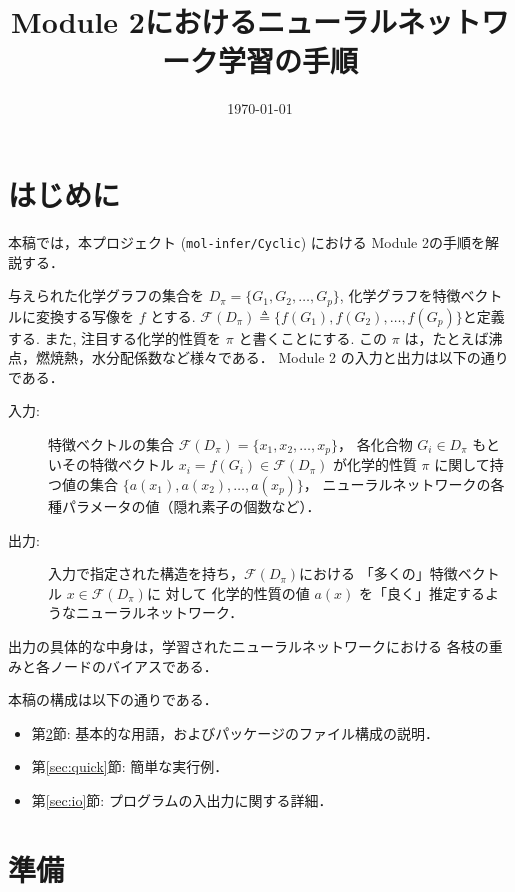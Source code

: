 \documentclass[11pt, titlepage, dvipdfmx, twoside]{jarticle}
\title{\huge Module 2におけるニューラルネットワーク学習の手順}
\author{\project}
\newcommand{\project}{{\tt mol-infer/Cyclic}}
\newcommand{\secref}[1]{第\ref{sec:#1}節}
\begin{document}
\makeatletter 
\let\c@lstlisting\c@figure
\makeatother
{}
\date{\today}
\maketitle
\thispagestyle{empty}
\tableofcontents
\clearpage
{}


\section{はじめに}
本稿では，本プロジェクト (\project) における Module 2の手順を解説する．

与えられた化学グラフの集合を $D_\pi=\{G_1,G_2,\dots,G_p\}$,
化学グラフを特徴ベクトルに変換する写像を $f$ とする.
${\mathcal F}(D_\pi)\triangleq\{f(G_1),f(G_2),\dots,f(G_p)\}$と定義する. 
また, 注目する化学的性質を $\pi$ と書くことにする.
この $\pi$ は，たとえば沸点，燃焼熱，水分配係数など様々である．
Module 2 の入力と出力は以下の通りである．

\begin{oframed}
\begin{description}
\item[入力:] 特徴ベクトルの集合 ${\mathcal F}(D_\pi)=\{x_1,x_2,\dots,x_p\}$，
  各化合物 $G_i\in D_\pi$ もといその特徴ベクトル $x_i=f(G_i)\in{\mathcal F}(D_\pi)$
  が化学的性質 $\pi$ に関して持つ値の集合 $\{a(x_1),a(x_2),\dots,a(x_p)\}$，
  ニューラルネットワークの各種パラメータの値（隠れ素子の個数など）．
\item[出力:] 入力で指定された構造を持ち，${\mathcal F}(D_\pi)$における
  「多くの」特徴ベクトル $x\in {\mathcal F}(D_\pi)$に
  対して
  化学的性質の値 $a(x)$ を「良く」推定するようなニューラルネットワーク．
\end{description}
\end{oframed}
出力の具体的な中身は，学習されたニューラルネットワークにおける
各枝の重みと各ノードのバイアスである．

本稿の構成は以下の通りである．
\begin{itemize}
\item \secref{preparation}: 基本的な用語，およびパッケージのファイル構成の説明．
\item \secref{quick}: 簡単な実行例．
\item \secref{io}: プログラムの入出力に関する詳細．
\end{itemize}

\newpage
\section{準備}
\label{sec:preparation}
\end{document}
